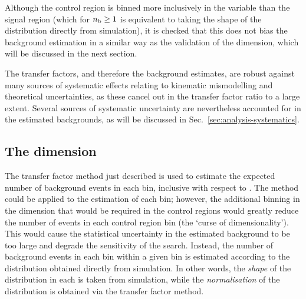 Although the \mmj control region is binned more inclusively in the \nb 
variable than the signal region (which for $n_{\text{b}} \ge 1$ is equivalent to taking 
the shape of the \nb distribution directly from simulation), it is checked that 
this does not bias the background estimation in a similar way as the validation 
of the \mht dimension, which will be discussed in the next section.

The transfer factors, and therefore the background estimates, are robust 
against many sources of systematic effects relating to kinematic mismodelling 
and theoretical uncertainties, 
as these cancel out in the transfer factor ratio to a large extent.
Several sources of systematic uncertainty are nevertheless accounted for in the 
estimated backgrounds, as will be discussed in 
Sec.~\ref{sec:analysis-systematics}.

\subsection{The \mht dimension}
\label{sec:analysis-estimation-mht}

The transfer factor method just described is used to estimate the expected 
number of background events in each \njnbht bin, inclusive with respect to 
\mht. 
The method could be applied to the estimation of each \njnbhtmht bin; however, 
the additional binning in the \mht dimension that would be required in the 
control regions would greatly reduce the number of events in each control 
region bin (the `curse of dimensionality'). This would cause the statistical 
uncertainty in the estimated background to be too large and degrade the 
sensitivity of the search. 
Instead, the number of background events in each \mht bin within a given 
\njnbht bin is estimated according to the \mht distribution obtained directly 
from simulation. 
In other words, the \textit{shape} of the \mht distribution in each \njnbht is 
taken from simulation, while the \textit{normalisation} of the distribution is 
obtained via the transfer factor method.

